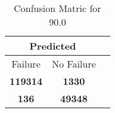 \begin{table}[] 
\caption{Confusion Matric for 90.0} 
\label{Table: Prediction Accuracy-DMD90.0OnlySunEKF-resetReflectionEKF-top2perfectNoFailurePrediction-Reflection} 
\centering 
\begin{tabular} 
 {@{}ccc@{}} 
\toprule 
\multicolumn{2}{c}{\textbf{Predicted}}
 \\ \midrule 
\multicolumn{1}{|c|}{Failure} & 
\multicolumn{1}{c|}{No Failure}
 \\ \midrule 
\multicolumn{1}{|c|}{\color{green}\textbf{119314}} & 
\multicolumn{1}{c|}{\color{red}\textbf{1330}}
 \\ \midrule 
\multicolumn{1}{|c|}{\color{red}\textbf{136}} & 
\multicolumn{1}{c|}{\color{green}\textbf{49348}}
 \\ \bottomrule 
\end{tabular} 
\end{table} 
